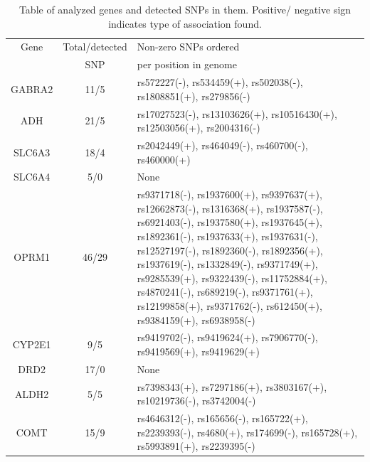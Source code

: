 \begin{table}[t]
\begin{footnotesize}
\centering
\begin{tabular}{c|c|p{4in}}
    \hline
    Gene   & Total/detected & Non-zero SNPs ordered                                                                                                                                                                                                                                                                                                             \\
    ~      & SNP            & per position in genome \\  \hline
GABRA2 &  11/5 & rs572227(-), rs534459(+), rs502038(-), rs1808851(+), rs279856(-) \\ \hline
  ADH &  21/5 & rs17027523(-), rs13103626(+), rs10516430(+), rs12503056(+), rs2004316(-) \\ \hline
  SLC6A3 &  18/4 & rs2042449(+), rs464049(-), rs460700(-), rs460000(+) \\ \hline
  SLC6A4 &   5/0 & None \\ \hline
  OPRM1 &  46/29 & rs9371718(-), rs1937600(+), rs9397637(+), rs12662873(-), rs1316368(+), rs1937587(-), rs6921403(-), rs1937580(+), rs1937645(+), rs1892361(-), rs1937633(+), rs1937631(-), rs12527197(-), rs1892360(-), rs1892356(+), rs1937619(-), rs1332849(-), rs9371749(+), rs9285539(+), rs9322439(-), rs11752884(+), rs4870241(-), rs689219(-), rs9371761(+), rs12199858(+), rs9371762(-), rs612450(+), rs9384159(+), rs6938958(-) \\ \hline
  CYP2E1 &   9/5 & rs9419702(-), rs9419624(+), rs7906770(-), rs9419569(+), rs9419629(+) \\ \hline
  DRD2 &  17/0 & None\\ \hline
  ALDH2 &   5/5 & rs7398343(+), rs7297186(+), rs3803167(+), rs10219736(-), rs3742004(-) \\ \hline
  COMT &  15/9 & rs4646312(-), rs165656(-), rs165722(+), rs2239393(-), rs4680(+), rs174699(-), rs165728(+), rs5993891(+), rs2239395(-) \\  \hline
\end{tabular}
\caption{Table of analyzed genes and detected SNPs in them. Positive/ negative sign indicates type of association found.}
\label{table:genetable}
\end{footnotesize}
\end{table}

